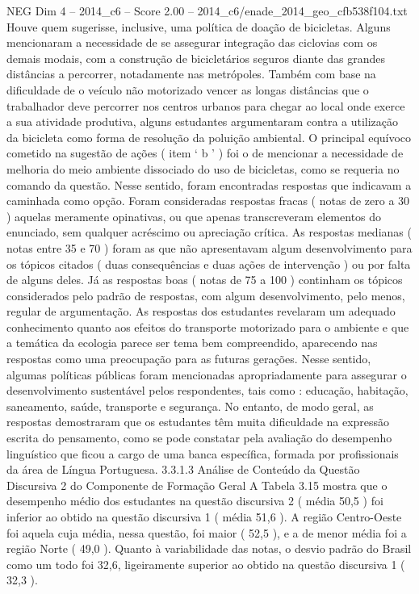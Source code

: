 \begin{textsample}{NEG Dim 4 – 2014\_c6 – Score 2.00 – 2014\_c6/enade\_2014\_geo\_cfb538f104.txt}
Houve quem sugerisse, inclusive, uma política de doação de bicicletas.
Alguns mencionaram a necessidade de se assegurar integração das ciclovias com os demais modais, com a construção de bicicletários seguros diante das grandes distâncias a percorrer, notadamente nas metrópoles.
Também com base na dificuldade de o veículo não motorizado vencer as longas distâncias que o trabalhador deve percorrer nos centros urbanos para chegar ao local onde exerce a sua atividade produtiva, alguns estudantes argumentaram contra a utilização da bicicleta como forma de resolução da poluição ambiental.
O principal equívoco cometido na sugestão de ações ( item ‘ b ’ ) foi o de mencionar a necessidade de melhoria do meio ambiente dissociado do uso de bicicletas, como se requeria no comando da questão.
Nesse sentido, foram encontradas respostas que indicavam a caminhada como opção.
Foram consideradas respostas fracas ( notas de zero a 30 ) aquelas meramente opinativas, ou que apenas transcreveram elementos do enunciado, sem qualquer acréscimo ou apreciação crítica.
As respostas medianas ( notas entre 35 e 70 ) foram as que não apresentavam algum desenvolvimento para os tópicos citados ( duas consequências e duas ações de intervenção ) ou por falta de alguns deles.
Já as respostas boas ( notas de 75 a 100 ) continham os tópicos considerados pelo padrão de respostas, com algum desenvolvimento, pelo menos, regular de argumentação.
As respostas dos estudantes revelaram um adequado conhecimento quanto aos efeitos do transporte motorizado para o ambiente e que a temática da ecologia parece ser tema bem compreendido, aparecendo nas respostas como uma preocupação para as futuras gerações.
Nesse sentido, algumas políticas públicas foram mencionadas apropriadamente para assegurar o desenvolvimento sustentável pelos respondentes, tais como : educação, habitação, saneamento, saúde, transporte e segurança.
No entanto, de modo geral, as respostas demostraram que os estudantes têm muita dificuldade na expressão escrita do pensamento, como se pode constatar pela avaliação do desempenho linguístico que ficou a cargo de uma banca específica, formada por profissionais da área de Língua Portuguesa. 3.3.1.3 Análise de Conteúdo da Questão Discursiva 2 do Componente de Formação Geral A Tabela 3.15 mostra que o desempenho médio dos estudantes na questão discursiva 2 ( média 50,5 ) foi inferior ao obtido na questão discursiva 1 ( média 51,6 ).
A região Centro-Oeste foi aquela cuja média, nessa questão, foi maior ( 52,5 ), e a de menor média foi a região Norte ( 49,0 ).
Quanto à variabilidade das notas, o desvio padrão do Brasil como um todo foi 32,6, ligeiramente superior ao obtido na questão discursiva 1 ( 32,3 ).

\end{textsample}
